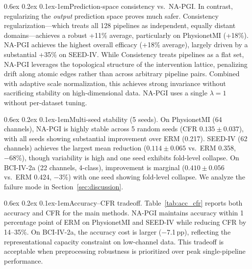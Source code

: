 \documentclass{article}
\makeatletter
\renewcommand{\paragraph}{\@startsection{paragraph}{4}{\z@}%
  {0.6ex \@plus 0.2ex \@minus 0.1ex}{-1em}{\normalsize\bf}}
\makeatother
\begin{document}
\paragraph{Prediction-space consistency vs.\ NA-PGI.}
In contrast, regularizing the \emph{output} prediction space proves much safer. Consistency regularization---which treats all 128 pipelines as independent, equally distant domains---achieves a robust +11\% average, particularly on PhysionetMI (+18\%). NA-PGI achieves the highest overall efficacy (+18\% average), largely driven by a substantial +35\% on SEED-IV. While Consistency treats pipelines as a flat set, NA-PGI leverages the topological structure of the intervention lattice, penalizing drift along atomic edges rather than across arbitrary pipeline pairs. Combined with adaptive scale normalization, this achieves strong invariance without sacrificing stability on high-dimensional data. NA-PGI uses a single $\lambda{=}1$ without per-dataset tuning.

\paragraph{Multi-seed stability (5 seeds).} On PhysionetMI (64 channels), NA-PGI is highly stable across 5 random seeds (CFR $0.135 \pm 0.037$), with all seeds showing substantial improvement over ERM (0.217). SEED-IV (62 channels) achieves the largest mean reduction ($0.114 \pm 0.065$ vs.\ ERM 0.358, $-68\%$), though variability is high and one seed exhibits fold-level collapse. On BCI-IV-2a (22 channels, 4-class), improvement is marginal ($0.410 \pm 0.056$ vs.\ ERM 0.424, $-3\%$) with one seed showing fold-level collapse. We analyze the failure mode in Section~\ref{sec:discussion}.

\paragraph{Accuracy--CFR tradeoff.} Table~\ref{tab:acc_cfr} reports both accuracy and CFR for the main methods. NA-PGI maintains accuracy within 1 percentage point of ERM on PhysionetMI and SEED-IV while reducing CFR by 14--35\%. On BCI-IV-2a, the accuracy cost is larger ($-$7.1\,pp), reflecting the representational capacity constraint on low-channel data. This tradeoff is acceptable when preprocessing robustness is prioritized over peak single-pipeline performance.
\end{document}
